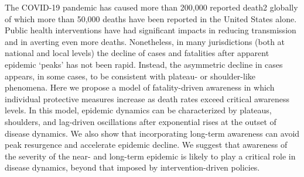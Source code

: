The COVID-19 pandemic has caused more than 200,000 reported death2
globally of which more than 50,000 deaths have been reported
in the United States alone. Public health interventions
have had significant impacts in reducing transmission and in
averting even more deaths. Nonetheless, in many jurisdictions
(both at national and local levels) the decline of cases and fatalities
after apparent epidemic `peaks' has not been rapid.  Instead, the asymmetric
decline in cases appears, in some cases, to be consistent
with plateau- or shoulder-like phenomena.  
Here we propose a model of fatality-driven
awareness in which individual protective measures increase
as death rates exceed critical awareness levels. 
In this model, epidemic dynamics
can be characterized by plateaus, shoulders,
and lag-driven oscillations after exponential rises
at the outset of disease dynamics. We also show that
incorporating long-term awareness can avoid peak resurgence and accelerate
epidemic decline.  We suggest that awareness of the severity of the near- and long-term epidemic is likely to play a critical
role in disease dynamics, beyond that imposed by intervention-driven policies.
